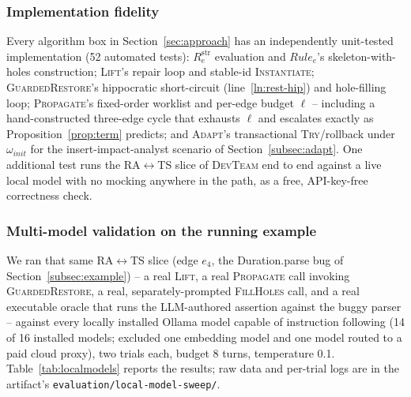 \documentclass[10pt, anonymous, conference]{IEEEtran}
\theoremstyle{definition}
\theoremstyle{plain}
\theoremstyle{remark}
\newcommand{\devteam}{\textsc{DevTeam}}
\newcommand{\str}{\mathrm{str}}
\newcommand{\code}[1]{\texttt{#1}}
\begin{document}
\subsubsection{Implementation fidelity}
Every algorithm box in Section~\ref{sec:approach} has an independently unit-tested implementation (52
automated tests): $R_e^{\str}$ evaluation and $\mathit{Rule}_e$'s skeleton-with-holes construction;
\textsc{Lift}'s repair loop and stable-id \textsc{Instantiate}; \textsc{GuardedRestore}'s hippocratic
short-circuit (line~\ref{ln:rest-hip}) and hole-filling loop; \textsc{Propagate}'s fixed-order worklist and
per-edge budget $\ell$ -- including a hand-constructed three-edge cycle that exhausts $\ell$ and escalates
exactly as Proposition~\ref{prop:term} predicts; and \textsc{Adapt}'s transactional \textsc{Try}/rollback
under $\omega_{\mathit{init}}$ for the insert-impact-analyst scenario of Section~\ref{subsec:adapt}. One
additional test runs the RA$\leftrightarrow$TS slice of \devteam{} end to end against a live local model
with no mocking anywhere in the path, as a free, API-key-free correctness check.

\subsubsection{Multi-model validation on the running example}
We ran that same RA$\leftrightarrow$TS slice (edge $e_4$, the Duration.parse bug of
Section~\ref{subsec:example}) -- a real \textsc{Lift}, a real \textsc{Propagate} call invoking
\textsc{GuardedRestore}, a real, separately-prompted \textsc{FillHoles} call, and a real executable oracle
that runs the LLM-authored assertion against the buggy parser -- against every locally installed Ollama
model capable of instruction following (14 of 16 installed models; excluded one embedding model and one
model routed to a paid cloud proxy), two trials each, budget 8 turns, temperature 0.1. Table~\ref{tab:localmodels}
reports the results; raw data and per-trial logs are in the artifact's \code{evaluation/local-model-sweep/}.
\end{document}
